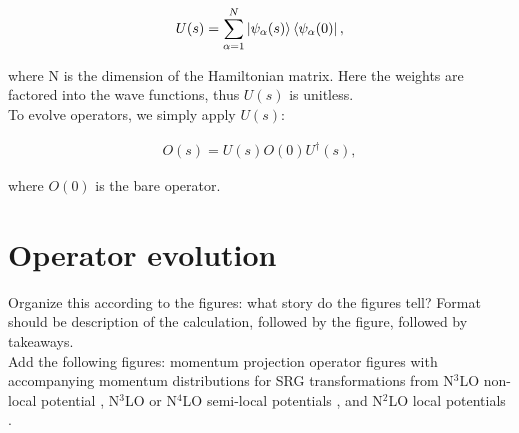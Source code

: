 \documentclass[preprintnumbers,floatfix,aps,prc,preprint,nofootinbib]{revtex4-1}
\begin{document}
\begin{eqnarray}
	\label{eq:unitary_transformation}
	U(s) = \sum_{\alpha=1}^{N} \ket{\psi_{\alpha}(s)} \bra{\psi_{\alpha}(0)},
\end{eqnarray}

where N is the dimension of the Hamiltonian matrix. Here the weights are factored into the wave functions, thus $U(s)$ is unitless.
\\

To evolve operators, we simply apply $U(s)$:

\begin{eqnarray}
	\label{eq:evolved_operator}
	O(s) = U(s) O(0) U^{\dagger}(s),
\end{eqnarray}

where $O(0)$ is the bare operator.


\section{Operator evolution}
\label{sec:operator_evolution}


Organize this according to the figures: what story do the figures tell? Format should be description of the calculation, followed by the figure, followed by takeaways.
\\

Add the following figures: momentum projection operator figures with accompanying momentum distributions for SRG transformations from N$^3$LO non-local potential \cite{Entem:2003ft}, N$^3$LO or N$^4$LO semi-local potentials \cite{Reinert:2017usi}, and N$^2$LO local potentials \cite{Gezerlis:2014zia}.
\\

\end{document}
